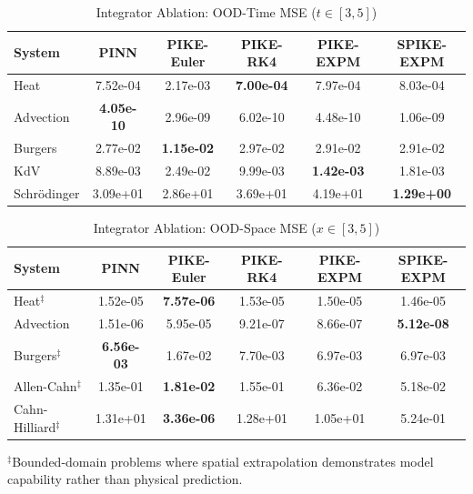\documentclass{article}
\theoremstyle{remark}
\begin{document}
\begin{table}[H]
\centering
\caption{Integrator Ablation: OOD-Time MSE ($t \in [3,5]$)}
\label{tab:integrator_ood_time}
\begin{tabular}{lccccc}
\toprule
System & PINN & PIKE-Euler & PIKE-RK4 & PIKE-EXPM & SPIKE-EXPM \\
\midrule
Heat & 7.52e-04 & 2.17e-03 & \textbf{7.00e-04} & 7.97e-04 & 8.03e-04 \\
Advection & \textbf{4.05e-10} & 2.96e-09 & 6.02e-10 & 4.48e-10 & 1.06e-09 \\
Burgers & 2.77e-02 & \textbf{1.15e-02} & 2.97e-02 & 2.91e-02 & 2.91e-02 \\
KdV & 8.89e-03 & 2.49e-02 & 9.99e-03 & \textbf{1.42e-03} & 1.81e-03 \\
Schr\"odinger & 3.09e+01 & 2.86e+01 & 3.69e+01 & 4.19e+01 & \textbf{1.29e+00} \\
\bottomrule
\end{tabular}
\end{table}

\begin{table}[H]
\centering
\caption{Integrator Ablation: OOD-Space MSE ($x \in [3,5]$)}
\label{tab:integrator_ood_space}
\begin{tabular}{lccccc}
\toprule
System & PINN & PIKE-Euler & PIKE-RK4 & PIKE-EXPM & SPIKE-EXPM \\
\midrule
Heat$^\ddagger$ & 1.52e-05 & \textbf{7.57e-06} & 1.53e-05 & 1.50e-05 & 1.46e-05 \\
Advection & 1.51e-06 & 5.95e-05 & 9.21e-07 & 8.66e-07 & \textbf{5.12e-08} \\
Burgers$^\ddagger$ & \textbf{6.56e-03} & 1.67e-02 & 7.70e-03 & 6.97e-03 & 6.97e-03 \\
Allen-Cahn$^\ddagger$ & 1.35e-01 & \textbf{1.81e-02} & 1.55e-01 & 6.36e-02 & 5.18e-02 \\
Cahn-Hilliard$^\ddagger$ & 1.31e+01 & \textbf{3.36e-06} & 1.28e+01 & 1.05e+01 & 5.24e-01 \\
\bottomrule
\end{tabular}
\vspace{0.5em}
\footnotesize{$^\ddagger$Bounded-domain problems where spatial extrapolation demonstrates model capability rather than physical prediction.}
\end{table}
\end{document}
